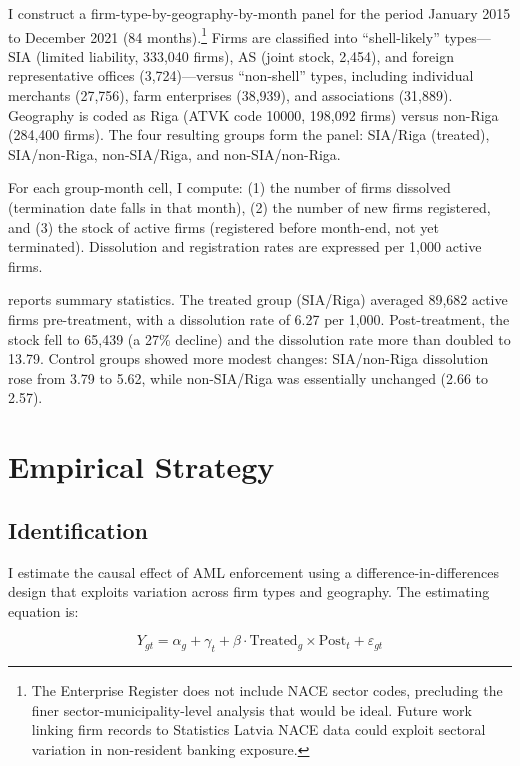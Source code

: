 \documentclass[12pt]{article}
\begin{document}
I construct a firm-type-by-geography-by-month panel for the period January 2015 to December 2021 (84 months).\footnote{The Enterprise Register does not include NACE sector codes, precluding the finer sector-municipality-level analysis that would be ideal. Future work linking firm records to Statistics Latvia NACE data could exploit sectoral variation in non-resident banking exposure.} Firms are classified into ``shell-likely'' types---SIA (limited liability, 333,040 firms), AS (joint stock, 2,454), and foreign representative offices (3,724)---versus ``non-shell'' types, including individual merchants (27,756), farm enterprises (38,939), and associations (31,889). Geography is coded as Riga (ATVK code 10000, 198,092 firms) versus non-Riga (284,400 firms). The four resulting groups form the panel: SIA/Riga (treated), SIA/non-Riga, non-SIA/Riga, and non-SIA/non-Riga.

For each group-month cell, I compute: (1) the number of firms dissolved (termination date falls in that month), (2) the number of new firms registered, and (3) the stock of active firms (registered before month-end, not yet terminated). Dissolution and registration rates are expressed per 1,000 active firms.

 reports summary statistics. The treated group (SIA/Riga) averaged 89,682 active firms pre-treatment, with a dissolution rate of 6.27 per 1,000. Post-treatment, the stock fell to 65,439 (a 27\% decline) and the dissolution rate more than doubled to 13.79. Control groups showed more modest changes: SIA/non-Riga dissolution rose from 3.79 to 5.62, while non-SIA/Riga was essentially unchanged (2.66 to 2.57).



\section{Empirical Strategy}
\label{sec:strategy}

\subsection{Identification}

I estimate the causal effect of AML enforcement using a difference-in-differences design that exploits variation across firm types and geography. The estimating equation is:

\begin{equation}
Y_{gt} = \alpha_g + \gamma_t + \beta \cdot \text{Treated}_g \times \text{Post}_t + \varepsilon_{gt}
\label{eq:did}
\end{equation}
\end{document}
